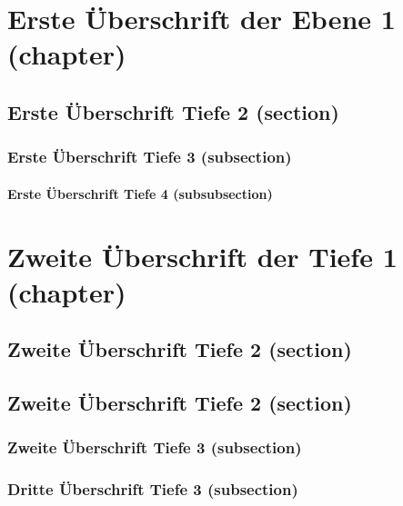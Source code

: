 \documentclass[MMR,Master,ngerman]{twbook}%
\begin{document}
\maketitle

%
%
\chapter{Erste Überschrift der Ebene 1 (chapter)}
\blinddocument

\blindmathpaper

\section{Erste Überschrift Tiefe 2 (section)}
\blindtext

\subsection{Erste Überschrift Tiefe 3 (subsection)}
\blindtext

\subsubsection{Erste Überschrift Tiefe 4 (subsubsection)}
\blindtext

\chapter{Zweite Überschrift der Tiefe 1 (chapter)}
\blindtext

\section{Zweite Überschrift Tiefe 2 (section)}
\blindtext

\section{Zweite Überschrift Tiefe 2 (section)}
\blindtext

\subsection{Zweite Überschrift Tiefe 3 (subsection)}
\blindtext

\subsection{Dritte Überschrift Tiefe 3 (subsection)}
\blindtext
\end{document}
